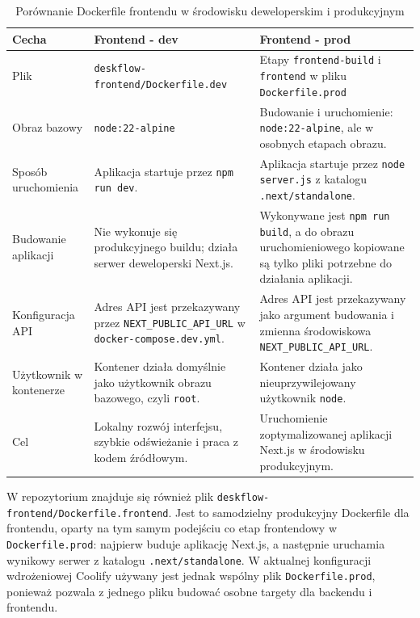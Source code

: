 \begin{table}[h!]
\centering
\small
\caption{Porównanie Dockerfile frontendu w środowisku deweloperskim i produkcyjnym}
\label{tab:dockerfile-frontend-dev-prod}
\begin{tabular}{|p{}|p{}|p{}|}
\hline
\textbf{Cecha} & \textbf{Frontend - dev} & \textbf{Frontend - prod} \\
\hline
Plik & \texttt{deskflow-frontend/Dockerfile.dev} & Etapy \texttt{frontend-build} i \texttt{frontend} w pliku \texttt{Dockerfile.prod} \\
\hline
Obraz bazowy & \texttt{node:22-alpine} & Budowanie i uruchomienie: \texttt{node:22-alpine}, ale w osobnych etapach obrazu. \\
\hline
Sposób uruchomienia & Aplikacja startuje przez \texttt{npm run dev}. & Aplikacja startuje przez \texttt{node server.js} z katalogu \texttt{.next/standalone}. \\
\hline
Budowanie aplikacji & Nie wykonuje się produkcyjnego buildu; działa serwer deweloperski Next.js. & Wykonywane jest \texttt{npm run build}, a do obrazu uruchomieniowego kopiowane są tylko pliki potrzebne do działania aplikacji. \\
\hline
Konfiguracja API & Adres API jest przekazywany przez \texttt{NEXT\_PUBLIC\_API\_URL} w \texttt{docker-compose.dev.yml}. & Adres API jest przekazywany jako argument budowania i zmienna środowiskowa \texttt{NEXT\_PUBLIC\_API\_URL}. \\
\hline
Użytkownik w kontenerze & Kontener działa domyślnie jako użytkownik obrazu bazowego, czyli \texttt{root}. & Kontener działa jako nieuprzywilejowany użytkownik \texttt{node}. \\
\hline
Cel & Lokalny rozwój interfejsu, szybkie odświeżanie i praca z kodem źródłowym. & Uruchomienie zoptymalizowanej aplikacji Next.js w środowisku produkcyjnym. \\
\hline
\end{tabular}
\end{table}

W repozytorium znajduje się również plik \texttt{deskflow-frontend/Dockerfile.frontend}. Jest to samodzielny produkcyjny Dockerfile dla frontendu, oparty na tym samym podejściu co etap frontendowy w \texttt{Dockerfile.prod}: najpierw buduje aplikację Next.js, a następnie uruchamia wynikowy serwer z katalogu \texttt{.next/standalone}. W aktualnej konfiguracji wdrożeniowej Coolify używany jest jednak wspólny plik \texttt{Dockerfile.prod}, ponieważ pozwala z jednego pliku budować osobne targety dla backendu i frontendu.

